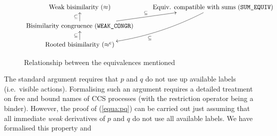\begin{figure}[ht]
\begin{displaymath}
\xymatrix@R=3ex{
{\textrm{Weak bisimilarity } (\approx)} & {\textrm{Equiv.
    compatible with sums (\texttt{SUM\_EQUIV})}} \ar@/^3ex/[ldd]^{\subseteq}\\
{\textrm{Bisimilarity congruence (\texttt{WEAK\_CONGR})}}
\ar[u]^{\subseteq} \ar[ru]^{\subseteq} \\
{\textrm{Rooted bisimilarity } (\rapprox)} \ar[u]^{\subseteq}
}
\end{displaymath}
\vspace{-2ex}
\caption{Relationship between the equivalences mentioned}
\label{fig:relationship}
\end{figure}

The standard argument \cite{Mil89} requires that $p$
and $q$ do not use up available labels (i.e.~visible actions).
Formalising such an argument requires  
a detailed treatment on free and bound names of CCS
processes (with the restriction operator being a binder).
However, the proof of (\ref{equa:pq}) can be carried out 
just assuming that all immediate \emph{weak} derivatives of
 $p$ and $q$ do not use  all available labels.
We have formalised this property and
